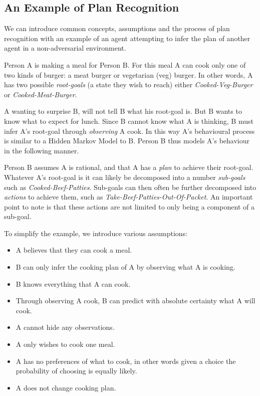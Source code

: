 \documentclass[parskip]{cs4rep}
\begin{document}
\subsection{An Example of Plan Recognition}

We can introduce common concepts, assumptions and the process of plan recognition with an example of an agent attempting to infer the plan of another agent in a non-adversarial environment. 

Person A is making a meal for Person B. For this meal A can cook only one of two kinds of burger: a meat burger or vegetarian (veg) burger. In other words, A has two possible \textit{root-goals} (a state they wish to reach) either \textit{Cooked-Veg-Burger} or \textit{Cooked-Meat-Burger}. 

A wanting to surprise B, will not tell B what his root-goal is. But B wants to know what to expect for lunch. Since B cannot know what A is thinking, B must infer A's root-goal through \textit{observing} A cook. In this way A's behavioural process is similar to a Hidden Markov Model to B. Person B thus models A's behaviour in the following manner. 

Person B assumes A is rational, and that A has a \textit{plan} to achieve their root-goal. Whatever A's root-goal is it can likely be decomposed into a number \textit{sub-goals} such as \textit{Cooked-Beef-Patties}. Sub-goals can then often be further decomposed into \textit{actions} to achieve them, such as \textit{Take-Beef-Patties-Out-Of-Packet}. An important point to note is that these actions are not limited to only being a component of a sub-goal.

To simplify the example, we introduce various assumptions:

\begin{itemize}
\item
A believes that they can cook a meal.
\item
B can only infer the cooking plan of A by observing what A is cooking.
\item
B knows everything that A can cook.
\item
Through observing A cook, B can predict with absolute certainty what A will cook.
\item
A cannot hide any observations.
\item
A only wishes to cook one meal.
\item
A has no preferences of what to cook, in other words given a choice the probability of choosing is equally likely.
\item
A does not change cooking plan.
\end{itemize}
\end{document}
